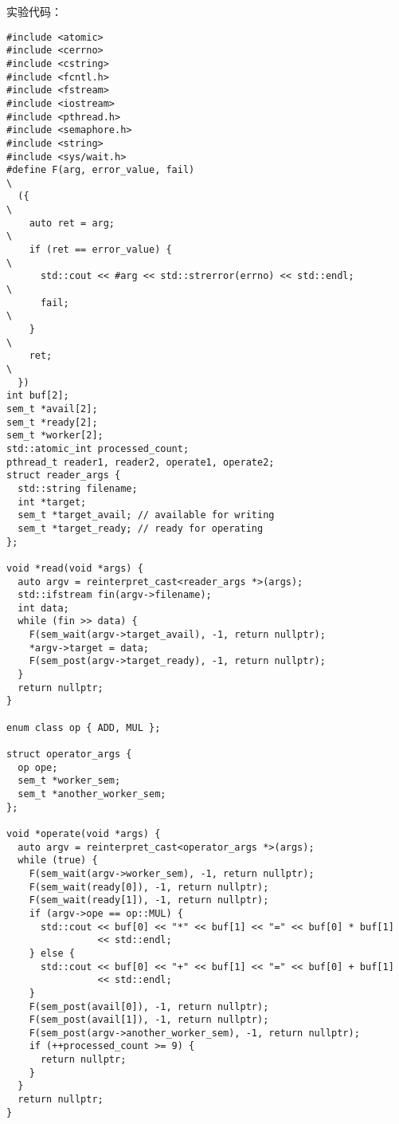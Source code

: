 \documentclass{ctexrep}
\begin{document}
实验代码：
\begin{verbatim}
#include <atomic>
#include <cerrno>
#include <cstring>
#include <fcntl.h>
#include <fstream>
#include <iostream>
#include <pthread.h>
#include <semaphore.h>
#include <string>
#include <sys/wait.h>
#define F(arg, error_value, fail)                                              \
  ({                                                                           \
    auto ret = arg;                                                            \
    if (ret == error_value) {                                                  \
      std::cout << #arg << std::strerror(errno) << std::endl;                  \
      fail;                                                                    \
    }                                                                          \
    ret;                                                                       \
  })
int buf[2];
sem_t *avail[2];
sem_t *ready[2];
sem_t *worker[2];
std::atomic_int processed_count;
pthread_t reader1, reader2, operate1, operate2;
struct reader_args {
  std::string filename;
  int *target;
  sem_t *target_avail; // available for writing
  sem_t *target_ready; // ready for operating
};

void *read(void *args) {
  auto argv = reinterpret_cast<reader_args *>(args);
  std::ifstream fin(argv->filename);
  int data;
  while (fin >> data) {
    F(sem_wait(argv->target_avail), -1, return nullptr);
    *argv->target = data;
    F(sem_post(argv->target_ready), -1, return nullptr);
  }
  return nullptr;
}

enum class op { ADD, MUL };

struct operator_args {
  op ope;
  sem_t *worker_sem;
  sem_t *another_worker_sem;
};

void *operate(void *args) {
  auto argv = reinterpret_cast<operator_args *>(args);
  while (true) {
    F(sem_wait(argv->worker_sem), -1, return nullptr);
    F(sem_wait(ready[0]), -1, return nullptr);
    F(sem_wait(ready[1]), -1, return nullptr);
    if (argv->ope == op::MUL) {
      std::cout << buf[0] << "*" << buf[1] << "=" << buf[0] * buf[1]
                << std::endl;
    } else {
      std::cout << buf[0] << "+" << buf[1] << "=" << buf[0] + buf[1]
                << std::endl;
    }
    F(sem_post(avail[0]), -1, return nullptr);
    F(sem_post(avail[1]), -1, return nullptr);
    F(sem_post(argv->another_worker_sem), -1, return nullptr);
    if (++processed_count >= 9) {
      return nullptr;
    }
  }
  return nullptr;
}


\end{verbatim}
\end{document}
